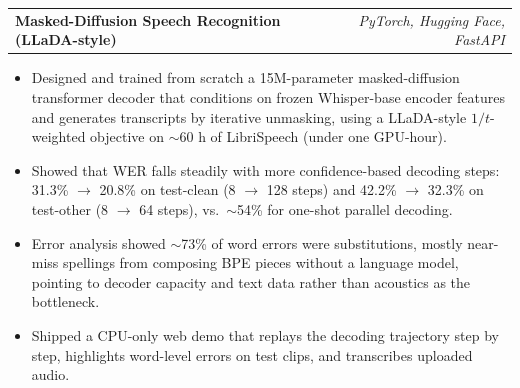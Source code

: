 \documentclass[letterpaper,11pt]{article}
\begin{document}
\begin{tabularx}{\linewidth}{ @{}X r@{} }
\textbf{Masked-Diffusion Speech Recognition (LLaDA-style)} %
 & \textit{\small PyTorch, Hugging Face, FastAPI} \\
\end{tabularx}
\vspace{-1.2em}
\begin{itemize}
    \item[--] Designed and trained from scratch a 15M-parameter masked-diffusion transformer decoder that conditions on frozen Whisper-base encoder features and generates transcripts by iterative unmasking, using a LLaDA-style $1/t$-weighted objective on $\sim$60 h of LibriSpeech (under one GPU-hour).\vspace{-0.5em}
    \item[--] Showed that WER falls steadily with more confidence-based decoding steps: 31.3\% $\rightarrow$ 20.8\% on test-clean (8 $\rightarrow$ 128 steps) and 42.2\% $\rightarrow$ 32.3\% on test-other (8 $\rightarrow$ 64 steps), vs.\ $\sim$54\% for one-shot parallel decoding.\vspace{-0.5em}
    \item[--] Error analysis showed $\sim$73\% of word errors were substitutions, mostly near-miss spellings from composing BPE pieces without a language model, pointing to decoder capacity and text data rather than acoustics as the bottleneck.\vspace{-0.5em}
    \item[--] Shipped a CPU-only web demo that replays the decoding trajectory step by step, highlights word-level errors on test clips, and transcribes uploaded audio.
\end{itemize}
\vspace{-0.2em}
\end{document}
